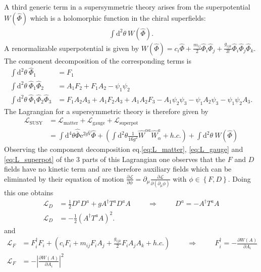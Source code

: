 A third generic term in a supersymmetric theory arises from the superpotential $W(\hat{\Phi})$ which is a holomorphic function in the chiral superfields:
\begin{align}
\int\mathrm{d}^2\theta\ W(\hat{\Phi}).
\end{align}
A renormalizable superpotential is given by $W(\hat{\Phi}) = c_i\hat{\Phi} + \frac{m_{ij}}{2}\hat{\Phi}_i\hat{\Phi}_j + \frac{g_{ijk}}{3!}\hat{\Phi}_i\hat{\Phi}_j\hat{\Phi}_k$. The component decomposition of the corresponding terms is
\begin{align}
\int\mathrm{d}^2\theta\ \hat{\Phi}_1 &= F_1\nonumber\\
\int\mathrm{d}^2\theta\ \hat{\Phi}_1\hat{\Phi}_2 &= A_1F_2 + F_1A_2-\psi_1\psi_2\nonumber\\
\int\mathrm{d}^2\theta\ \hat{\Phi}_1\hat{\Phi}_2\hat{\Phi}_3 &= F_1A_2A_3 + A_1F_2A_3 + A_1A_2F_3 - A_1\psi_2\psi_3 - \psi_1A_2\psi_3 - \psi_1\psi_2A_3.\label{eq:L_superpot}
\end{align}
The Lagrangian for a supersymmetric theory is therefore given by 
\begin{align}
\mathcal{L}_{\mathrm{SUSY}} &= \mathcal{L}_{\mathrm{matter}} + \mathcal{L}_{\mathrm{gauge}} + \mathcal{L}_{\mathrm{superpot}}\nonumber\\
&=\int\mathrm{d}^4\theta\hat{\overline{\Phi}}\mathrm{e}^{2g\hat{V}}\hat{\Phi} + \left(\int\mathrm{d}^2\theta \frac{1}{16g^2 }\hat{W}^{\alpha a} \hat{W}^a_\alpha + h.c. \right) +\int\mathrm{d}^2\theta\ W(\hat{\Phi})
\end{align}
Observing the component decomposition eq.\ref{eq:L_matter}, \ref{eq:L_gauge} and \ref{eq:L_superpot} of the 3 parts of this Lagrangian one observes that the $F$ and $D$ fields have no kinetic term and are therefore auxiliary fields which can be eliminated by their equation of motion $\frac{\partial \mathcal{L}}{\partial\phi} = \partial_\mu\frac{\partial \mathcal{L}}{\partial(\partial_\mu \phi)}$ with $\phi \in \left\{ F, D \right\}$. Doing this one obtains
\begin{align}
\mathcal{L}_D &= \frac{1}{2} D^aD^a + g A^\dagger T^aD^a A \hspace{1cm} \Rightarrow \hspace{1cm} D^a = - A^\dagger T^a A \nonumber\\
\mathcal{L}_D &= -\frac{1}{2}\left( A^\dagger T^a A \right)^2.
\end{align}
and 
\begin{align}
\mathcal{L}_F &= F_i^\dagger F_i + \left( c_iF_i + m_{ij}F_iA_j + \frac{g_{ijk}}{2}F_iA_jA_k + h.c. \right) \hspace{1cm} \Rightarrow \hspace{1cm} F^\dagger_i = - \frac{\partial W(A)}{\partial A_i}\nonumber\\
\mathcal{L}_F &= -\left| \frac{\partial W(A)}{\partial A_i} \right|^2
\end{align}



